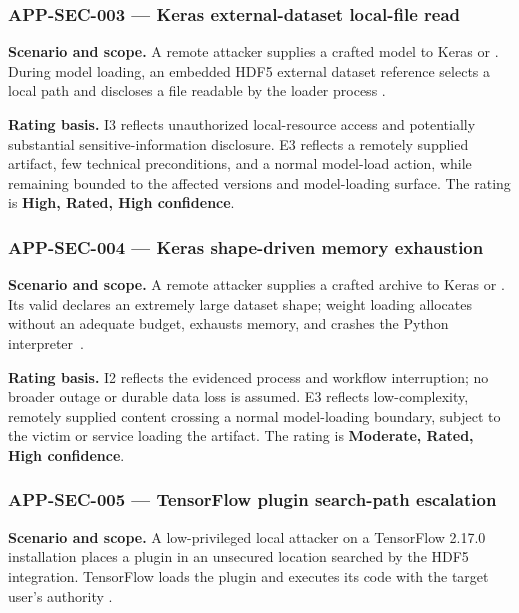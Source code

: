 \documentclass[../main.tex]{subfiles}
\begin{document}
\subsubsection*{APP-SEC-003 --- Keras external-dataset local-file read}

\noindent\textbf{Scenario and scope.}
A remote attacker supplies a crafted  model to Keras
 or . During model loading, an
embedded HDF5 external dataset reference selects a local path and discloses a
file readable by the loader process
\cite{cve-2026-1669,keras-ghsa-3m4q-jmj6-r34q}.

\noindent\textbf{Rating basis.}
I3 reflects unauthorized local-resource access and potentially substantial
sensitive-information disclosure. E3 reflects a remotely supplied artifact,
few technical preconditions, and a normal model-load action, while remaining
bounded to the affected versions and model-loading surface. The rating is
\textbf{High, Rated, High confidence}.

\subsubsection*{APP-SEC-004 --- Keras shape-driven memory exhaustion}

\noindent\textbf{Scenario and scope.}
A remote attacker supplies a crafted  archive to Keras
 or . Its valid
 declares an extremely large dataset shape; weight
loading allocates without an adequate budget, exhausts memory, and crashes the
Python interpreter~\cite{cve-2026-0897,keras-ghsa-mgx6-5cf9-rr43}.

\noindent\textbf{Rating basis.}
I2 reflects the evidenced process and workflow interruption; no broader outage
or durable data loss is assumed. E3 reflects low-complexity, remotely supplied
content crossing a normal model-loading boundary, subject to the victim or
service loading the artifact. The rating is \textbf{Moderate, Rated, High
confidence}.

\subsubsection*{APP-SEC-005 --- TensorFlow plugin search-path escalation}

\noindent\textbf{Scenario and scope.}
A low-privileged local attacker on a TensorFlow 2.17.0 installation places a
plugin in an unsecured location searched by the HDF5 integration. TensorFlow
loads the plugin and executes its code with the target user's authority
\cite{cve-2026-2492,zdi-26-116,tensorflow-commit-46e7f7f}.
\end{document}
